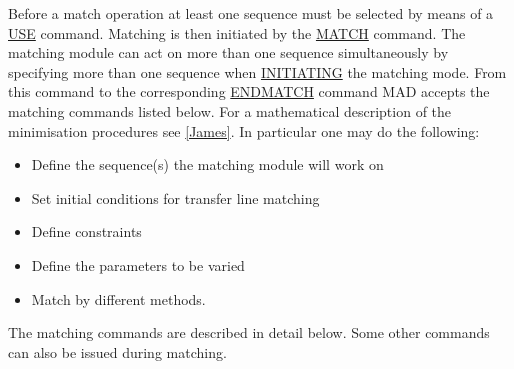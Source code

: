   Before a match operation at least one sequence must be selected by means of a \href{../control/general.html#use}{USE} command. Matching is then initiated by the \href{match_main.html}{MATCH} command. The matching module can act on more than one sequence simultaneously by  specifying more than one sequence when  \href{match_main.html#match}{INITIATING} the matching mode.  From this command to the corresponding \href{match_main.html#endmatch}{ENDMATCH} command MAD accepts the matching commands listed below. For a mathematical description of the minimisation procedures see \href{bibliography.html#minuit}{[James]}. In particular one may do the following: 
\begin{itemize}
	\item Define the sequence(s) the matching module will work on 
	\item Set initial conditions for transfer line matching 
	\item Define constraints 
	\item Define the parameters to be varied 
	\item Match by different methods. 
\end{itemize} The matching commands are described in detail below. Some other commands can also be issued during matching.  
